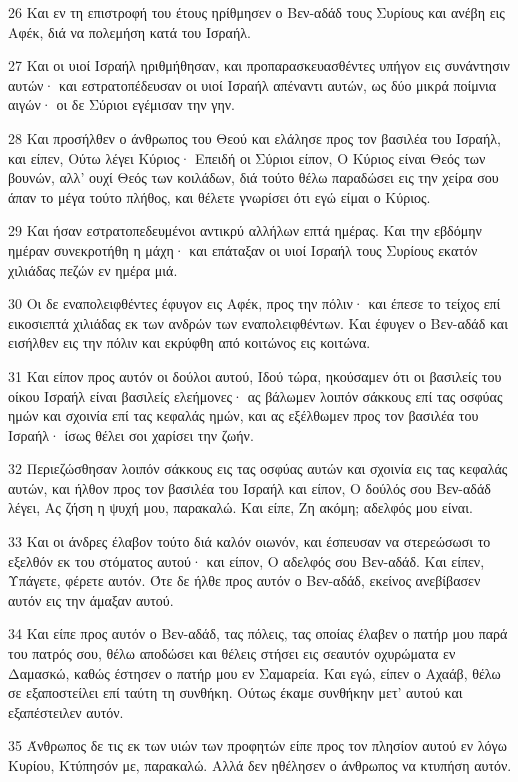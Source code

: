 \par 26 Και εν τη επιστροφή του έτους ηρίθμησεν ο Βεν-αδάδ τους Συρίους και ανέβη εις Αφέκ, διά να πολεμήση κατά του Ισραήλ.
\par 27 Και οι υιοί Ισραήλ ηριθμήθησαν, και προπαρασκευασθέντες υπήγον εις συνάντησιν αυτών· και εστρατοπέδευσαν οι υιοί Ισραήλ απέναντι αυτών, ως δύο μικρά ποίμνια αιγών· οι δε Σύριοι εγέμισαν την γην.
\par 28 Και προσήλθεν ο άνθρωπος του Θεού και ελάλησε προς τον βασιλέα του Ισραήλ, και είπεν, Ούτω λέγει Κύριος· Επειδή οι Σύριοι είπον, Ο Κύριος είναι Θεός των βουνών, αλλ' ουχί Θεός των κοιλάδων, διά τούτο θέλω παραδώσει εις την χείρα σου άπαν το μέγα τούτο πλήθος, και θέλετε γνωρίσει ότι εγώ είμαι ο Κύριος.
\par 29 Και ήσαν εστρατοπεδευμένοι αντικρύ αλλήλων επτά ημέρας. Και την εβδόμην ημέραν συνεκροτήθη η μάχη· και επάταξαν οι υιοί Ισραήλ τους Συρίους εκατόν χιλιάδας πεζών εν ημέρα μιά.
\par 30 Οι δε εναπολειφθέντες έφυγον εις Αφέκ, προς την πόλιν· και έπεσε το τείχος επί εικοσιεπτά χιλιάδας εκ των ανδρών των εναπολειφθέντων. Και έφυγεν ο Βεν-αδάδ και εισήλθεν εις την πόλιν και εκρύφθη από κοιτώνος εις κοιτώνα.
\par 31 Και είπον προς αυτόν οι δούλοι αυτού, Ιδού τώρα, ηκούσαμεν ότι οι βασιλείς του οίκου Ισραήλ είναι βασιλείς ελεήμονες· ας βάλωμεν λοιπόν σάκκους επί τας οσφύας ημών και σχοινία επί τας κεφαλάς ημών, και ας εξέλθωμεν προς τον βασιλέα του Ισραήλ· ίσως θέλει σοι χαρίσει την ζωήν.
\par 32 Περιεζώσθησαν λοιπόν σάκκους εις τας οσφύας αυτών και σχοινία εις τας κεφαλάς αυτών, και ήλθον προς τον βασιλέα του Ισραήλ και είπον, Ο δούλός σου Βεν-αδάδ λέγει, Ας ζήση η ψυχή μου, παρακαλώ. Και είπε, Ζη ακόμη; αδελφός μου είναι.
\par 33 Και οι άνδρες έλαβον τούτο διά καλόν οιωνόν, και έσπευσαν να στερεώσωσι το εξελθόν εκ του στόματος αυτού· και είπον, Ο αδελφός σου Βεν-αδάδ. Και είπεν, Υπάγετε, φέρετε αυτόν. Ότε δε ήλθε προς αυτόν ο Βεν-αδάδ, εκείνος ανεβίβασεν αυτόν εις την άμαξαν αυτού.
\par 34 Και είπε προς αυτόν ο Βεν-αδάδ, τας πόλεις, τας οποίας έλαβεν ο πατήρ μου παρά του πατρός σου, θέλω αποδώσει και θέλεις στήσει εις σεαυτόν οχυρώματα εν Δαμασκώ, καθώς έστησεν ο πατήρ μου εν Σαμαρεία. Και εγώ, είπεν ο Αχαάβ, θέλω σε εξαποστείλει επί ταύτη τη συνθήκη. Ούτως έκαμε συνθήκην μετ' αυτού και εξαπέστειλεν αυτόν.
\par 35 Άνθρωπος δε τις εκ των υιών των προφητών είπε προς τον πλησίον αυτού εν λόγω Κυρίου, Κτύπησόν με, παρακαλώ. Αλλά δεν ηθέλησεν ο άνθρωπος να κτυπήση αυτόν.
